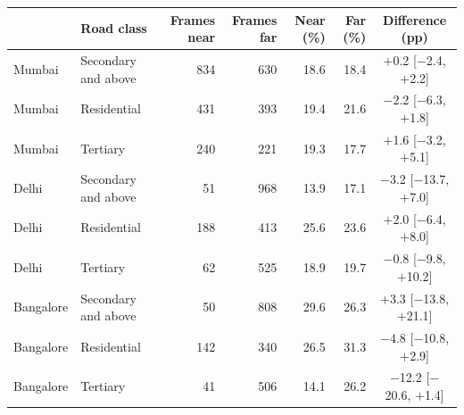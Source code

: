 \begin{tabular}{llrrrrc}
\toprule
 & Road class & Frames near & Frames far & Near (\%) & Far (\%) & Difference (pp) \\
\midrule
Mumbai & Secondary and above & 834 & 630 & 18.6 & 18.4 & $+$0.2 [$-$2.4, $+$2.2] \\
Mumbai & Residential & 431 & 393 & 19.4 & 21.6 & $-$2.2 [$-$6.3, $+$1.8] \\
Mumbai & Tertiary & 240 & 221 & 19.3 & 17.7 & $+$1.6 [$-$3.2, $+$5.1] \\
Delhi & Secondary and above & 51 & 968 & 13.9 & 17.1 & $-$3.2 [$-$13.7, $+$7.0] \\
Delhi & Residential & 188 & 413 & 25.6 & 23.6 & $+$2.0 [$-$6.4, $+$8.0] \\
Delhi & Tertiary & 62 & 525 & 18.9 & 19.7 & $-$0.8 [$-$9.8, $+$10.2] \\
Bangalore & Secondary and above & 50 & 808 & 29.6 & 26.3 & $+$3.3 [$-$13.8, $+$21.1] \\
Bangalore & Residential & 142 & 340 & 26.5 & 31.3 & $-$4.8 [$-$10.8, $+$2.9] \\
Bangalore & Tertiary & 41 & 506 & 14.1 & 26.2 & $-$12.2 [$-$20.6, $+$1.4] \\
\bottomrule
\end{tabular}
